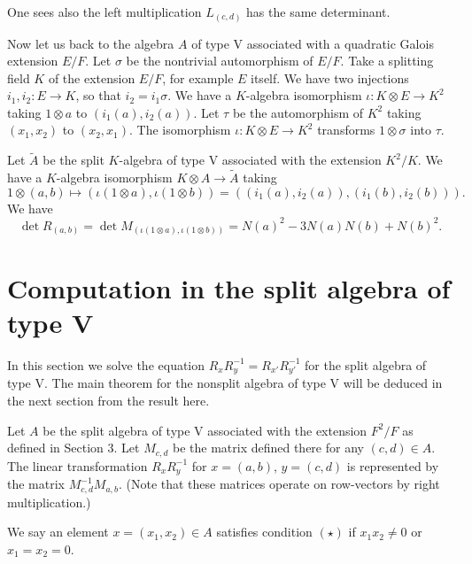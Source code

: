 \documentclass{article}
\begin{document}
One sees also the left multiplication $L_{(c,d)}$ has the same determinant.

Now let us back to the algebra $A$ of type V associated with a quadratic Galois extension $E/F$. Let $\sigma$ be the nontrivial automorphism of $E/F$.
Take  a splitting field $K$ of the extension $E/F$, for example $E$ itself.
We have two injections $i_1,i_2\colon E\to K$, so that $i_2=i_1\sigma$.
We have a $K$-algebra isomorphism
$\iota\colon K\otimes E\to  K^2$ taking $
1\otimes a$ to $(i_1(a), i_2(a))$.
Let $\tau$ be the automorphism of $K^2$ taking $(x_1,x_2)$ to $(x_2,x_1)$.
The isomorphism $\iota\colon K\otimes E\to K^2$  transforms $1\otimes \sigma$ into $\tau$. 

Let $\tilde A$ be the split $K$-algebra of type V associated with the  extension $K^2/K$. 
We have a $K$-algebra isomorphism
$K\otimes A\to \tilde A$ taking 
$$
1\otimes (a,b) \mapsto (\iota(1\otimes a), \iota(1\otimes b))
=((i_1(a), i_2(a)), (i_1(b), i_2(b))).
$$
We have
$$
\det R_{(a,b)}=\det M_{(\iota(1\otimes a), \iota(1\otimes b))}=
N(a)^2-3N(a)N(b)+N(b)^2.
$$




\section{Computation in the split algebra of type V}


In this section we solve the equation 
$R_{x}R_{y}^{-1}=R_{x'}R_{y'}^{-1}$ for the split algebra of type V.
The main theorem for the nonsplit algebra of type V will be deduced in the next section from the result here.

Let $A$ be the split algebra of type V associated with the extension $F^2/F$ as defined in Section 3.
Let $M_{c,d}$ be the matrix defined there for any $(c,d)\in A$.
The linear transformation $R_{x}R_{y}^{-1}$ for $x=(a,b)$, $y=(c,d)$ is represented by the matrix $M_{c,d}^{-1}M_{a,b}$. (Note that these matrices operate on row-vectors by right multiplication.)

We say an element $x=(x_1,x_2)\in A$ satisfies condition $(\star)$ if $x_1x_2\ne 0$ or $x_1=x_2=0$.
\end{document}
